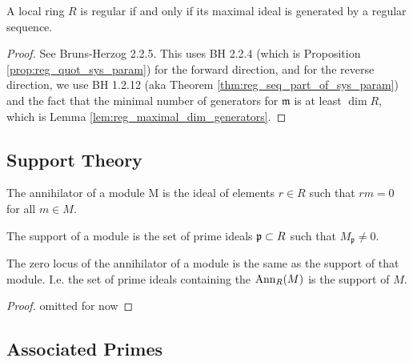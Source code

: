 \begin{proposition}
  \label{prop:reg_loc_maximal_reg_seq}
  A local ring $R$ is regular if and only if
  its maximal ideal is generated by a regular sequence.
\end{proposition}

\begin{proof}
  See Bruns-Herzog 2.2.5. This uses BH 2.2.4 
  (which is Proposition \ref{prop:reg_quot_sys_param}) for the forward
  direction,
  and for the reverse direction, we use BH 1.2.12 
  (aka Theorem \ref{thm:reg_seq_part_of_sys_param}) 
  and the fact that
  the minimal number of generators for $\mathfrak{m}$ is at least
  $\dim R$, which is Lemma \ref{lem:reg_maximal_dim_generators}.
\end{proof}

\subsection{Support Theory}

\begin{definition}
  \label{def:annihilator}
  The annihilator of a module M is the ideal
  of elements $r \in R$ such that $rm = 0$ for 
  all $m \in M$.
\end{definition}

\begin{definition}
  \label{def:support_module}
  The support of a module is the set of prime ideals
  $\mathfrak{p} \subset R$ such that 
  $M_{\mathfrak{p}} \neq 0$.
\end{definition}

\begin{lemma}
  \label{lem:annihilator_zero_locus_support}
  The zero locus of the annihilator of a module
  is the same as the support of that module.
  I.e. the set of prime ideals containing the 
  $\operatorname{Ann}_R(M)$ is the support of $M$.
\end{lemma}

\begin{proof}
  omitted for now
\end{proof}

\subsection{Associated Primes}


